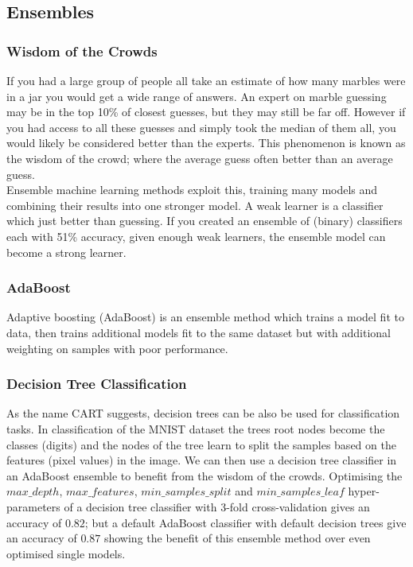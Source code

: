 \documentclass[11pt]{article}
\begin{document}

\subsection{Ensembles}
\label{boosting}

\subsubsection{Wisdom of the Crowds}

If you had a large group of people all take an estimate of how many marbles were in a jar you would get a wide range of answers. An expert on marble guessing may be in the top 10\% of closest guesses, but they may still be far off. However if you had access to all these guesses and simply took the median of them all, you would likely be considered better than the experts. This phenomenon is known as the wisdom of the crowd; where the average guess often better than an average guess. \\

Ensemble machine learning methods exploit this, training many models and combining their results into one stronger model. A weak learner is a classifier which just better than guessing. If you created an ensemble of (binary) classifiers each with 51\% accuracy, given enough weak learners, the ensemble model can become a strong learner.

\subsubsection{AdaBoost}

Adaptive boosting (AdaBoost) is an ensemble method which trains a model fit to data, then trains additional models fit to the same dataset but with additional weighting on samples with poor performance. 

\subsubsection{Decision Tree Classification}

As the name CART suggests, decision trees can be also be used for classification tasks. In classification of the MNIST dataset the trees root nodes become the classes (digits) and the nodes of the tree learn to split the samples based on the features (pixel values) in the image. We can then use a decision tree classifier in an AdaBoost ensemble to benefit from the wisdom of the crowds. Optimising the $max\_depth$, $max\_features$, $min\_samples\_split$ and $min\_samples\_leaf$ hyper-parameters of a decision tree classifier with 3-fold cross-validation gives an accuracy of $0.82$; but a default AdaBoost classifier with default decision trees give an accuracy of $0.87$ showing the benefit of this ensemble method over even optimised single models.
\end{document}
